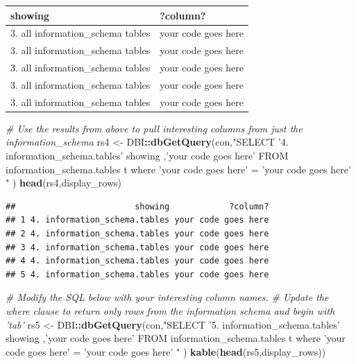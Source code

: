 \documentclass[]{book}
\newenvironment{Shaded}{\begin{snugshade}}{\end{snugshade}}
\newcommand{\CommentTok}[1]{\textcolor[rgb]{0.56,0.35,0.01}{\textit{#1}}}
\newcommand{\KeywordTok}[1]{\textcolor[rgb]{0.13,0.29,0.53}{\textbf{#1}}}
\newcommand{\NormalTok}[1]{#1}
\newcommand{\OperatorTok}[1]{\textcolor[rgb]{0.81,0.36,0.00}{\textbf{#1}}}
\newcommand{\StringTok}[1]{\textcolor[rgb]{0.31,0.60,0.02}{#1}}
\theoremstyle{definition}
\theoremstyle{definition}
\theoremstyle{definition}
\theoremstyle{remark}
\begin{document}
\begin{tabular}{l|l}
\hline
showing & ?column?\\
\hline
3. all information\_schema tables & your code goes here\\
\hline
3. all information\_schema tables & your code goes here\\
\hline
3. all information\_schema tables & your code goes here\\
\hline
3. all information\_schema tables & your code goes here\\
\hline
3. all information\_schema tables & your code goes here\\
\hline
\end{tabular}

\begin{Shaded}
\begin{Highlighting}[]
\CommentTok{# Use the results from above to pull interesting columns from just the information_schema}
\NormalTok{rs4 <-}\StringTok{ }\NormalTok{DBI}\OperatorTok{::}\KeywordTok{dbGetQuery}\NormalTok{(con,}\StringTok{"SELECT '4. information_schema.tables' showing}
\StringTok{                                  ,'your code goes here' }
\StringTok{                              FROM information_schema.tables t}
\StringTok{                             where 'your code goes here' = 'your code goes here'}
\StringTok{                            "}
\NormalTok{                      )}
\KeywordTok{head}\NormalTok{(rs4,display_rows)}
\end{Highlighting}
\end{Shaded}

\begin{verbatim}
##                        showing            ?column?
## 1 4. information_schema.tables your code goes here
## 2 4. information_schema.tables your code goes here
## 3 4. information_schema.tables your code goes here
## 4 4. information_schema.tables your code goes here
## 5 4. information_schema.tables your code goes here
\end{verbatim}

\begin{Shaded}
\begin{Highlighting}[]
\CommentTok{# Modify the SQL below with your interesting column names.}
\CommentTok{# Update the where clause to return only rows from the information schema and begin with 'tab'}
\NormalTok{rs5 <-}\StringTok{ }\NormalTok{DBI}\OperatorTok{::}\KeywordTok{dbGetQuery}\NormalTok{(con,}\StringTok{"SELECT '5. information_schema.tables' showing}
\StringTok{                                  ,'your code goes here' }
\StringTok{                              FROM information_schema.tables t}
\StringTok{                             where 'your code goes here' = 'your code goes here'}
\StringTok{                            "}
\NormalTok{                      )}
\KeywordTok{kable}\NormalTok{(}\KeywordTok{head}\NormalTok{(rs5,display_rows))}
\end{Highlighting}
\end{Shaded}
\end{document}
